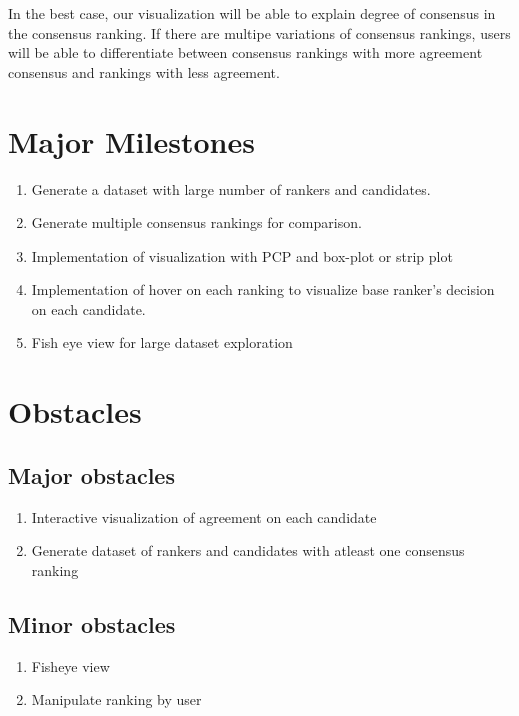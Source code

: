 \documentclass{proc}
\begin{document}
In the best case, our visualization will be able to explain degree of consensus in the consensus ranking. If there are multipe variations of consensus rankings, users will be able to differentiate between consensus rankings with more agreement consensus and rankings with less agreement.

\section{Major Milestones}
\begin{enumerate}
  \item Generate a dataset with large number of rankers and candidates. 
  \item Generate multiple consensus rankings for comparison.
  \item Implementation of visualization with PCP and box-plot or strip plot
  \item Implementation of hover on each ranking to visualize base ranker's decision on each candidate.
  \item Fish eye view for large dataset exploration
\end{enumerate}

\section{Obstacles}

\subsection{Major obstacles} %
\begin{enumerate}
  \item Interactive visualization of agreement on each candidate
  \item Generate dataset of rankers and candidates with atleast one consensus ranking
\end{enumerate}

\subsection{Minor obstacles}
\begin{enumerate}
  \item Fisheye view 
  \item Manipulate ranking by user
\end{enumerate}
\end{document}

